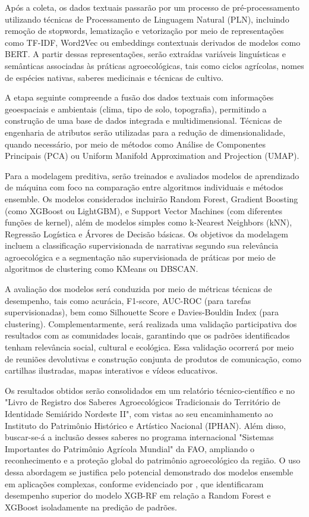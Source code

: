 Após a coleta, os dados textuais passarão por um processo de pré-processamento utilizando técnicas de Processamento de Linguagem Natural (PLN), incluindo remoção de stopwords, lematização e vetorização por meio de representações como TF-IDF, Word2Vec ou embeddings contextuais derivados de modelos como BERT. A partir dessas representações, serão extraídas variáveis linguísticas e semânticas associadas às práticas agroecológicas, tais como ciclos agrícolas, nomes de espécies nativas, saberes medicinais e técnicas de cultivo.

A etapa seguinte compreende a fusão dos dados textuais com informações geoespaciais e ambientais (clima, tipo de solo, topografia), permitindo a construção de uma base de dados integrada e multidimensional. Técnicas de engenharia de atributos serão utilizadas para a redução de dimensionalidade, quando necessário, por meio de métodos como Análise de Componentes Principais (PCA) ou Uniform Manifold Approximation and Projection (UMAP).

Para a modelagem preditiva, serão treinados e avaliados modelos de aprendizado de máquina com foco na comparação entre algoritmos individuais e métodos ensemble. Os modelos considerados incluirão Random Forest, Gradient Boosting (como XGBoost ou LightGBM), e Support Vector Machines (com diferentes funções de kernel), além de modelos simples como k-Nearest Neighbors (kNN), Regressão Logística e Árvores de Decisão básicas. Os objetivos da modelagem incluem a classificação supervisionada de narrativas segundo sua relevância agroecológica e a segmentação não supervisionada de práticas por meio de algoritmos de clustering como KMeans ou DBSCAN.

A avaliação dos modelos será conduzida por meio de métricas técnicas de desempenho, tais como acurácia, F1-score, AUC-ROC (para tarefas supervisionadas), bem como Silhouette Score e Davies-Bouldin Index (para clustering). Complementarmente, será realizada uma validação participativa dos resultados com as comunidades locais, garantindo que os padrões identificados tenham relevância social, cultural e ecológica. Essa validação ocorrerá por meio de reuniões devolutivas e construção conjunta de produtos de comunicação, como cartilhas ilustradas, mapas interativos e vídeos educativos.

Os resultados obtidos serão consolidados em um relatório técnico-científico e no "Livro de Registro dos Saberes Agroecológicos Tradicionais do Território de Identidade Semiárido Nordeste II", com vistas ao seu encaminhamento ao Instituto do Patrimônio Histórico e Artístico Nacional (IPHAN). Além disso, buscar-se-á a inclusão desses saberes no programa internacional "Sistemas Importantes do Patrimônio Agrícola Mundial" da FAO, ampliando o reconhecimento e a proteção global do patrimônio agroecológico da região. O uso dessa abordagem se justifica pelo potencial demonstrado dos modelos ensemble em aplicações complexas, conforme evidenciado por  , que identificaram desempenho superior do modelo XGB-RF em relação a Random Forest e XGBoost isoladamente na predição de padrões.



